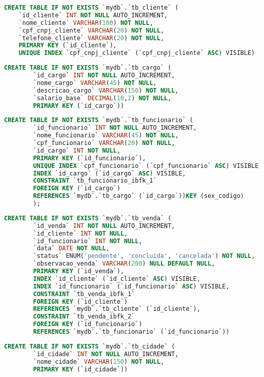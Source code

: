 \documentclass[
12pt,
a4paper,
semrecuonosumario,
sumario = abnt-6027-2012]{report}
\begin{document}
    \begin{lstlisting}[language=SQL,caption={DDL -- Tabela \texttt{tb\_cliente}}]
    CREATE TABLE IF NOT EXISTS `mydb`.`tb_cliente` (
    `id_cliente` INT NOT NULL AUTO_INCREMENT,
    `nome_cliente` VARCHAR(100) NOT NULL,
    `cpf_cnpj_cliente` VARCHAR(20) NOT NULL,
    `telefone_cliente` VARCHAR(20) NOT NULL,
    PRIMARY KEY (`id_cliente`),
    UNIQUE INDEX `cpf_cnpj_cliente` (`cpf_cnpj_cliente` ASC) VISIBLE)
    \end{lstlisting}
    \begin{lstlisting}[language=SQL,caption={DDL -- Tabela \texttt{tb\_cargo}}]
    	CREATE TABLE IF NOT EXISTS `mydb`.`tb_cargo` (
    	`id_cargo` INT NOT NULL AUTO_INCREMENT,
    	`nome_cargo` VARCHAR(45) NOT NULL,
    	`descricao_cargo` VARCHAR(150) NOT NULL,
    	`salario_base` DECIMAL(10,2) NOT NULL,
    	PRIMARY KEY (`id_cargo`))
    \end{lstlisting}
    \begin{lstlisting}[language=SQL,caption={DDL -- Tabela \texttt{tb\_funcionario}}]
    	CREATE TABLE IF NOT EXISTS `mydb`.`tb_funcionario` (
    	`id_funcionario` INT NOT NULL AUTO_INCREMENT,
    	`nome_funcionario` VARCHAR(45) NOT NULL,
    	`cpf_funcionario` VARCHAR(20) NOT NULL,
    	`id_cargo` INT NOT NULL,
    	PRIMARY KEY (`id_funcionario`),
    	UNIQUE INDEX `cpf_funcionario` (`cpf_funcionario` ASC) VISIBLE,
    	INDEX `id_cargo` (`id_cargo` ASC) VISIBLE,
    	CONSTRAINT `tb_funcionario_ibfk_1`
    	FOREIGN KEY (`id_cargo`)
    	REFERENCES `mydb`.`tb_cargo` (`id_cargo`))KEY (sex_codigo)
    	);
    \end{lstlisting}
    \begin{lstlisting}[language=SQL,caption={DDL -- Tabela \texttt{tb\_venda}}]
    	CREATE TABLE IF NOT EXISTS `mydb`.`tb_venda` (
    	`id_venda` INT NOT NULL AUTO_INCREMENT,
    	`id_cliente` INT NOT NULL,
    	`id_funcionario` INT NOT NULL,
    	`data` DATE NOT NULL,
    	`status` ENUM('pendente', 'concluida', 'cancelada') NOT NULL,
    	`observacao_venda` VARCHAR(200) NULL DEFAULT NULL,
    	PRIMARY KEY (`id_venda`),
    	INDEX `id_cliente` (`id_cliente` ASC) VISIBLE,
    	INDEX `id_funcionario` (`id_funcionario` ASC) VISIBLE,
    	CONSTRAINT `tb_venda_ibfk_1`
    	FOREIGN KEY (`id_cliente`)
    	REFERENCES `mydb`.`tb_cliente` (`id_cliente`),
    	CONSTRAINT `tb_venda_ibfk_2`
    	FOREIGN KEY (`id_funcionario`)
    	REFERENCES `mydb`.`tb_funcionario` (`id_funcionario`))
    \end{lstlisting}
    \begin{lstlisting}[language=SQL,caption={DDL -- Tabela \texttt{tb\_cidade}}]
    	CREATE TABLE IF NOT EXISTS `mydb`.`tb_cidade` (
    	`id_cidade` INT NOT NULL AUTO_INCREMENT,
    	`nome_cidade` VARCHAR(150) NOT NULL,
    	PRIMARY KEY (`id_cidade`))
    \end{lstlisting}
\end{document}

